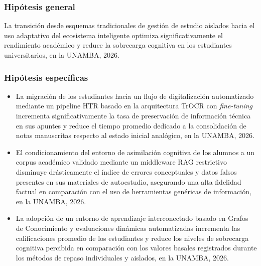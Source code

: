 \subsubsection{Hipótesis general}
La transición desde esquemas tradicionales de gestión de estudio aislados hacia el uso adaptativo del ecosistema inteligente optimiza significativamente el rendimiento académico y reduce la sobrecarga cognitiva en los estudiantes universitarios, en la UNAMBA, 2026.

\subsubsection{Hipótesis específicas}
\begin{itemize}

\item
La migración de los estudiantes hacia un flujo de digitalización automatizado mediante un pipeline HTR basado en la arquitectura TrOCR con \textit{fine-tuning} incrementa significativamente la tasa de preservación de información técnica en sus apuntes y reduce el tiempo promedio dedicado a la consolidación de notas manuscritas respecto al estado inicial analógico, en la UNAMBA, 2026.

\item
El condicionamiento del entorno de asimilación cognitiva de los alumnos a un corpus académico validado mediante un middleware RAG restrictivo disminuye drásticamente el índice de errores conceptuales y datos falsos presentes en sus materiales de autoestudio, asegurando una alta fidelidad factual en comparación con el uso de herramientas genéricas de información, en la UNAMBA, 2026.

\item
La adopción de un entorno de aprendizaje interconectado basado en Grafos de Conocimiento y evaluaciones dinámicas automatizadas incrementa las calificaciones promedio de los estudiantes y reduce los niveles de sobrecarga cognitiva percibida en comparación con los valores basales registrados durante los métodos de repaso individuales y aislados, en la UNAMBA, 2026.

\end{itemize}

